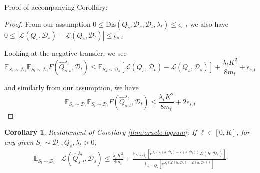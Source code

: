 \documentclass{article}
\theoremstyle{plain}
\newtheorem{corollary}[theorem]{Corollary}
\theoremstyle{definition}
\theoremstyle{remark}
\begin{document}

Proof of accompanying Corollary:
\begin{proof}
From our assumption $0\leq \mathrm{Dis}(Q_s,\mathcal{D}_s, \mathcal{D}_t, \lambda_t ) \leq \epsilon_{s,t}$ we also have $0\leq |\mathcal{L}(Q_s,\mathcal{D}_s)-\mathcal{L}(Q_s,\mathcal{D}_t)|
\leq \epsilon_{s,t}$

Looking at the negative transfer, we see
\begin{equation*}
\mathbb{E}_{S_s\sim \mathcal{D}_s}\mathbb{E}_{S_t\sim \mathcal{D}_t}F(\hat{Q}^{\lambda_t}_{s:t},\mathcal{D}_t)\leq \mathbb{E}_{S_s\sim \mathcal{D}_s}\left [\mathcal{L}(Q_{s},\mathcal{D}_t)-\mathcal{L}(Q_{s},\mathcal{D}_s)\right ]+\frac{\lambda_t K^2}{8m_t} + \epsilon_{s,t}
\end{equation*}

and similarly from our assumption, we have
\begin{equation*}
\mathbb{E}_{S_s\sim \mathcal{D}_s}\mathbb{E}_{S_t\sim \mathcal{D}_t}F(\hat{Q}^{\lambda_t}_{s:t},\mathcal{D}_t)\leq \frac{\lambda_t K^2}{8m_t} + 2\epsilon_{s,t}
\end{equation*}

\end{proof}


\begin{corollary} Restatement of Corollary \ref{thm:oracle-logsum}:
If $\ell\in[0,K]$, for any given $S_s\sim \mathcal{D}_s, Q_s, \lambda_t>0$, 
%
\begin{equation} 
\begin{split}
\mathbb{E}_{S_t\sim \mathcal{D}_t}&\mathcal{L}( \hat{Q}^{\lambda_t}_{s:t},\mathcal{D}_s)\leq \frac{\lambda_t K^2}{8m_t}+\frac{\mathbb{E}_{h\sim Q_s}\left [e^{\lambda_t(\mathcal{L}(h,\mathcal{D}_s)-\mathcal{L}(h,\mathcal{D}_t))}\mathcal{L}(h,\mathcal{D}_s) \right ]}{\mathbb{E}_{h\sim Q_s}\left [e^{\lambda_t(\mathcal{L}(h,\mathcal{D}_s)-\mathcal{L}(h,\mathcal{D}_t))}\right ]}
\end{split}
\end{equation}
\end{corollary}
\end{document}
